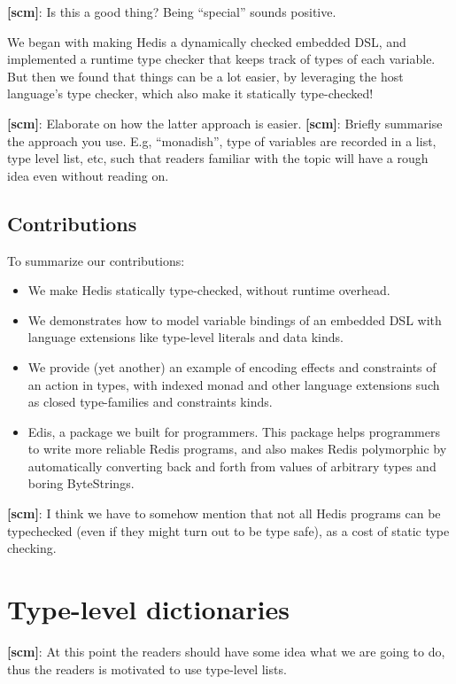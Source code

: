 \documentclass[pldi]{sigplanconf-pldi16}
\newcommand{\todo}[2]{{\bf [#1]}: #2}
\begin{document}
\todo{scm}{Is this a good thing? Being ``special'' sounds positive.}

We began with making Hedis a dynamically checked embedded DSL, and implemented a runtime type checker that keeps track of types of
each variable. But then we found that things can be a lot easier,
by leveraging the host language's type checker,
which also make it statically type-checked!

\todo{scm}{Elaborate on how the latter approach is easier.}
\todo{scm}{Briefly summarise the approach you use. E.g, ``monadish'',
type of variables are recorded in a list, type level list, etc, such
that readers familiar with the topic will have a rough idea even
without reading on.}

\subsection{Contributions}

To summarize our contributions:

\begin{itemize}[noitemsep]
\item We make Hedis statically type-checked, without runtime overhead.
\item We demonstrates how to model variable bindings of an embedded DSL with
 language extensions like type-level literals and data kinds.
\item We provide (yet another) an example of encoding effects and constraints of
 an action in types, with indexed monad\cite{indexedmonad} and other language
 extensions such as closed type-families\cite{closedtypefamilies} and
 constraints kinds\cite{constraintskinds}.
\item Edis, a package we built for programmers. This package helps programmers
 to write more reliable Redis programs, and also makes Redis polymorphic by
 automatically converting back and forth from values of arbitrary types and
 boring ByteStrings.
\end{itemize}

\todo{scm}{I think we have to somehow mention that
not all Hedis programs can be typechecked (even if they might
turn out to be type safe), as a cost of static type checking.}

\section{Type-level dictionaries}

\todo{scm}{At this point the readers should have some idea
what we are going to do, thus the readers is motivated to
use type-level lists.}
\end{document}
